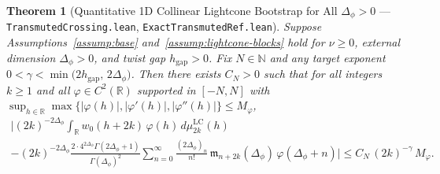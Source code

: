 \documentclass[10pt,a4paper]{article}
\newtheorem{theorem}{Theorem}
\theoremstyle{definition}
\begin{document}
\begin{theorem}[Quantitative 1D Collinear Lightcone Bootstrap for All \texorpdfstring{$\Delta_\phi > 0$}{Delta\_phi > 0} --- \texttt{TransmutedCrossing.lean}, \texttt{ExactTransmutedRef.lean}]
\label{thm:primary-bootstrap}
Suppose Assumptions~\ref{assump:base} and~\ref{assump:lightcone-blocks} hold for $\nu \ge 0$, external dimension $\Delta_\phi > 0$, and twist gap $h_{\mathrm{gap}} > 0$. Fix $N \in \mathbb{N}$ and any target exponent $0 < \gamma < \min\bigl(2 h_{\mathrm{gap}},\, 2\Delta_\phi\bigr)$. Then there exists $C_N > 0$ such that for all integers $k \ge 1$ and all $\varphi \in C^2(\mathbb{R})$ supported in $[-N, N]$ with $\sup_{h \in \mathbb{R}} \max\{|\varphi(h)|, |\varphi'(h)|, |\varphi''(h)|\} \le M_\varphi$,
\begin{multline}
  \label{eq:primary-bootstrap}
  \Biggl|(2k)^{-2\Delta_\phi} \int_{\mathbb{R}} w_0(h + 2k) \, \varphi(h) \, d\mu^{\mathrm{LC}}_{2k}(h) \\
    - (2k)^{-2\Delta_\phi} \frac{2 \cdot 4^{2\Delta_\phi} \Gamma(2\Delta_\phi + 1)}{\Gamma(\Delta_\phi)^2} \sum_{n=0}^{\infty} \frac{(2\Delta_\phi)_n}{n!} \, \mathfrak{m}_{n + 2k}(\Delta_\phi) \, \varphi(\Delta_\phi + n)\Biggr|
  \le C_N \, (2k)^{-\gamma} \, M_\varphi.
\end{multline}
\end{theorem}
\end{document}
